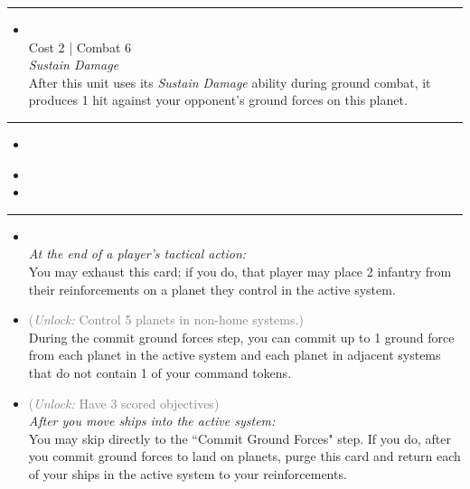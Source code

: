 \begin{multicols}{2}
\vspace{-10pt}\rule{\hsize}{0.4pt}\vspace{5pt}


\begin{itemize}
\item {}
\\
Cost 2 | Combat 6 \\
\emph{Sustain Damage}\\
After this unit uses its \emph{Sustain Damage} ability during ground combat, it produces 1 hit against your opponent's ground forces on this planet.
\end{itemize}

\vspace{-10pt}\rule{\hsize}{0.4pt}\vspace{5pt}


\begin{itemize}
\item \exoI
\end{itemize}

\columnbreak
{}

\begin{itemize}
\item \exoII
\item \valkyrie
\end{itemize}

\vspace{-10pt}\rule{\hsize}{0.4pt}\vspace{5pt}


\begin{itemize}
\item {}\\
\emph{At the end of a player's tactical action:}
\\
You may exhaust this card; if you do, that player may place 2 infantry from their reinforcements on a planet they control in the active system. 
\item {} \textcolor{gray}{(\emph{Unlock:} Control 5 planets in non-home systems.)}\\
During the commit ground forces step, you can commit up to 1 ground force from each planet in the active system and each planet in adjacent systems that do not contain 1 of your command tokens.
\item {} \textcolor{gray}{(\emph{Unlock:} Have 3 scored objectives)}\\
\emph{After you move ships into the active system:}\\
You may skip directly to the ``Commit Ground Forces" step. If you do, after you commit ground forces to land on planets, purge this card and return each of your ships in the active system to your reinforcements.
\end{itemize}


\end{multicols}
